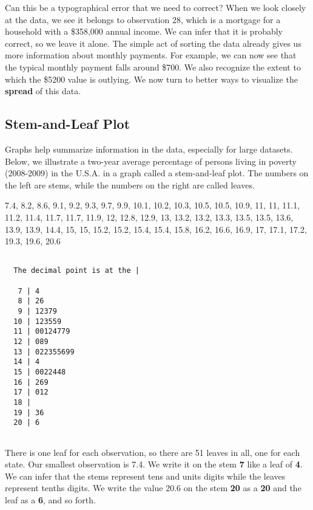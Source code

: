 \documentclass[11pt]{book}\usepackage[]{graphicx}\usepackage[]{color}
\begin{document}
\vspace{3mm}

Can this be a typographical error that we need to correct?  When we look closely at the data, we see it belongs to observation 28, which is a mortgage for a household with a \$358,000 annual income.  We can infer that it is probably correct, so we leave it alone. The simple act of sorting the data already gives us more information about monthly payments.  For example, we can now see that the typical monthly payment falls around \$700.  We also recognize the extent to which the \$5200 value is outlying. We now turn to better ways to visualize the \textbf{spread} of this data.

\subsection{Stem-and-Leaf Plot}




Graphs help summarize information in the data, especially for large datasets.  Below, we illustrate a two-year average percentage of persons living in poverty (2008-2009) in the U.S.A. in a graph called a stem-and-leaf plot.  The numbers on the left are stems, while the numbers on the right are called leaves.


\begin{minipage}[ht]{7cm}

{\small{


7.4, 8.2, 8.6, 9.1, 9.2, 9.3, 9.7, 9.9, 10.1, 10.2, 10.3, 10.5, 10.5, 10.9, 11, 11, 11.1, 11.2, 11.4, 11.7, 11.7, 11.9, 12, 12.8, 12.9, 13, 13.2, 13.2, 13.3, 13.5, 13.5, 13.6, 13.9, 13.9, 14.4, 15, 15, 15.2, 15.2, 15.4, 15.4, 15.8, 16.2, 16.6, 16.9, 17, 17.1, 17.2, 19.3, 19.6, 20.6
}}
\end{minipage} %
\begin{minipage}[ht]{7cm}

{\small{
\begin{verbatim}

  The decimal point is at the |

   7 | 4
   8 | 26
   9 | 12379
  10 | 123559
  11 | 00124779
  12 | 089
  13 | 022355699
  14 | 4
  15 | 0022448
  16 | 269
  17 | 012
  18 | 
  19 | 36
  20 | 6


\end{verbatim}
}}
\end{minipage}

There is one leaf for each observation, so there are 51 leaves in all, one for each state.  Our smallest observation is 7.4.  We write it on the stem \textbf{7} like a leaf of \textbf{4}.  We can infer that the stems represent tens and units digits while the leaves represent tenths digits.  We write the value 20.6 on the stem \textbf{20} as a \textbf{20} and the leaf as a \textbf{6}, and so forth.  \citep{sullivan2013}
\end{document}

